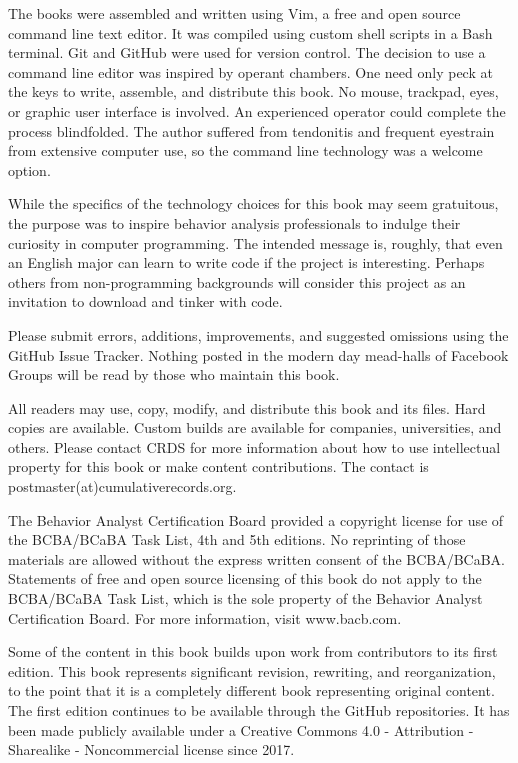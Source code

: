 The books were assembled and written using Vim, a free and open source command line text editor. It was compiled using custom shell scripts in a Bash terminal. Git and GitHub were used for version control. The decision to use a command line editor was inspired by operant chambers. One need only peck at the keys to write, assemble, and distribute this book. No mouse, trackpad, eyes, or graphic user interface is involved. An experienced operator could complete the process blindfolded. The author suffered from tendonitis and frequent eyestrain from extensive computer use, so the command line technology was a welcome option.

While the specifics of the technology choices for this book may seem gratuitous, the purpose was to inspire behavior analysis professionals to indulge their curiosity in computer programming. The intended message is, roughly, that even an English major can learn to write code if the project is interesting. Perhaps others from non-programming backgrounds will consider this project as an invitation to download and tinker with code.

Please submit errors, additions, improvements, and suggested omissions using the GitHub Issue Tracker. Nothing posted in the modern day mead-halls of Facebook Groups will be read by those who maintain this book.

All readers may use, copy, modify, and distribute this book and its files. Hard copies are available. Custom builds are available for companies, universities, and others. Please contact CRDS for more information about how to use intellectual property for this book or make content contributions. The contact is postmaster(at)cumulativerecords.org.

The Behavior Analyst Certification Board provided a copyright license for use of the BCBA/BCaBA Task List, 4th and 5th editions. No reprinting of those materials are allowed without the express written consent of the BCBA/BCaBA. Statements of free and open source licensing of this book do not apply to the BCBA/BCaBA Task List, which is the sole property of the Behavior Analyst Certification Board. For more information, visit www.bacb.com.

Some of the content in this book builds upon work from contributors to its first edition. This book represents significant revision, rewriting, and reorganization, to the point that it is a completely different book representing original content. The first edition continues to be available through the GitHub repositories. It has been made publicly available under a Creative Commons 4.0 - Attribution - Sharealike - Noncommercial license since 2017.
\clearpage

